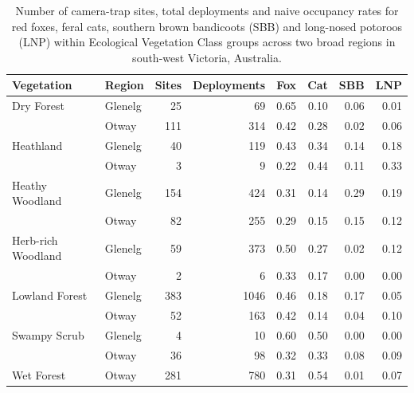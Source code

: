 \documentclass[]{elsarticle} %
\begin{document}
\begin{longtable}[t]{llrrrrrr}
\caption{\label{tab:occ-naive}Number of camera-trap sites, total deployments and naive occupancy rates for red foxes, feral cats, southern brown bandicoots (SBB) and long-nosed potoroos (LNP) within Ecological Vegetation Class groups across two broad regions in south-west Victoria, Australia.}\\
\toprule
Vegetation & Region & Sites & Deployments & Fox & Cat & SBB & LNP\\
\midrule
Dry Forest & Glenelg & 25 & 69 & 0.65 & 0.10 & 0.06 & 0.01\\
 & Otway & 111 & 314 & 0.42 & 0.28 & 0.02 & 0.06\\
Heathland & Glenelg & 40 & 119 & 0.43 & 0.34 & 0.14 & 0.18\\
 & Otway & 3 & 9 & 0.22 & 0.44 & 0.11 & 0.33\\
Heathy Woodland & Glenelg & 154 & 424 & 0.31 & 0.14 & 0.29 & 0.19\\
\addlinespace
 & Otway & 82 & 255 & 0.29 & 0.15 & 0.15 & 0.12\\
Herb-rich Woodland & Glenelg & 59 & 373 & 0.50 & 0.27 & 0.02 & 0.12\\
 & Otway & 2 & 6 & 0.33 & 0.17 & 0.00 & 0.00\\
Lowland Forest & Glenelg & 383 & 1046 & 0.46 & 0.18 & 0.17 & 0.05\\
 & Otway & 52 & 163 & 0.42 & 0.14 & 0.04 & 0.10\\
\addlinespace
Swampy Scrub & Glenelg & 4 & 10 & 0.60 & 0.50 & 0.00 & 0.00\\
 & Otway & 36 & 98 & 0.32 & 0.33 & 0.08 & 0.09\\
Wet Forest & Otway & 281 & 780 & 0.31 & 0.54 & 0.01 & 0.07\\
\bottomrule
\end{longtable}
\endgroup{}

\newpage
\end{document}

